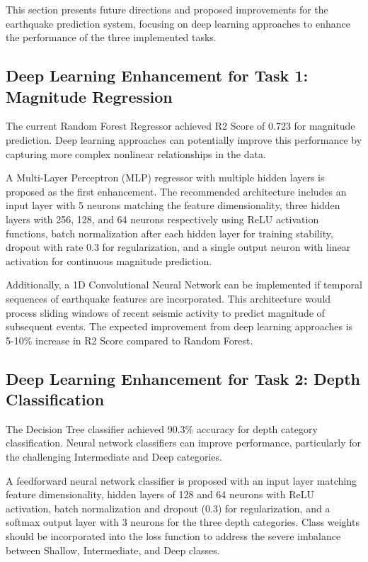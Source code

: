 
This section presents future directions and proposed improvements for the earthquake prediction system, focusing on deep learning approaches to enhance the performance of the three implemented tasks.

\subsection{Deep Learning Enhancement for Task 1: Magnitude Regression}

The current Random Forest Regressor achieved R2 Score of 0.723 for magnitude prediction. Deep learning approaches can potentially improve this performance by capturing more complex nonlinear relationships in the data.

A Multi-Layer Perceptron (MLP) regressor with multiple hidden layers is proposed as the first enhancement. The recommended architecture includes an input layer with 5 neurons matching the feature dimensionality, three hidden layers with 256, 128, and 64 neurons respectively using ReLU activation functions, batch normalization after each hidden layer for training stability, dropout with rate 0.3 for regularization, and a single output neuron with linear activation for continuous magnitude prediction.

Additionally, a 1D Convolutional Neural Network can be implemented if temporal sequences of earthquake features are incorporated. This architecture would process sliding windows of recent seismic activity to predict magnitude of subsequent events. The expected improvement from deep learning approaches is 5-10\% increase in R2 Score compared to Random Forest.

\subsection{Deep Learning Enhancement for Task 2: Depth Classification}

The Decision Tree classifier achieved 90.3\% accuracy for depth category classification. Neural network classifiers can improve performance, particularly for the challenging Intermediate and Deep categories.

A feedforward neural network classifier is proposed with an input layer matching feature dimensionality, hidden layers of 128 and 64 neurons with ReLU activation, batch normalization and dropout (0.3) for regularization, and a softmax output layer with 3 neurons for the three depth categories. Class weights should be incorporated into the loss function to address the severe imbalance between Shallow, Intermediate, and Deep classes.

